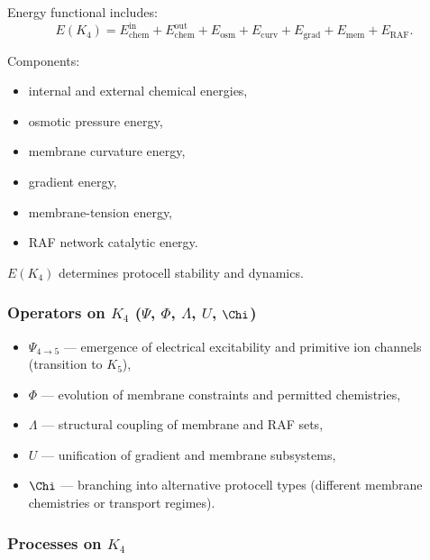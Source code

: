 Energy functional includes:
\[
E(K_4) =
E_{\mathrm{chem}}^{\mathrm{in}} + E_{\mathrm{chem}}^{\mathrm{out}}
+ E_{\mathrm{osm}} + E_{\mathrm{curv}}
+ E_{\mathrm{grad}} + E_{\mathrm{mem}}
+ E_{\mathrm{RAF}}.
\]

Components:
\begin{itemize}
    \item internal and external chemical energies,
    \item osmotic pressure energy,
    \item membrane curvature energy,
    \item gradient energy,
    \item membrane-tension energy,
    \item RAF network catalytic energy.
\end{itemize}

$E(K_4)$ determines protocell stability and dynamics.

\subsubsection{Operators on \texorpdfstring{$K_4$}{K_4} (\texorpdfstring{$\Psi$}{\Psi}, \texorpdfstring{$\Phi$}{\Phi}, \texorpdfstring{$\Lambda$}{\Lambda}, \texorpdfstring{$U$}{U}, \texorpdfstring{$\Chi$}{\Chi})}

\begin{itemize}
    \item $\Psi_{4\to5}$ — emergence of electrical excitability and
          primitive ion channels (transition to $K_5$),
    \item $\Phi$ — evolution of membrane constraints and permitted
          chemistries,
    \item $\Lambda$ — structural coupling of membrane and RAF sets,
    \item $U$ — unification of gradient and membrane subsystems,
    \item $\Chi$ — branching into alternative protocell types (different
          membrane chemistries or transport regimes).
\end{itemize}

\subsubsection{Processes on \texorpdfstring{$K_4$}{K_4}}

